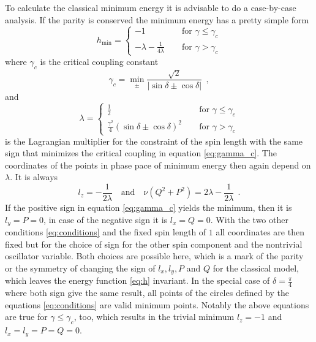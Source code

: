 To calculate the classical minimum energy it is advisable to do a case-by-case analysis. 
If the parity is conserved the minimum energy has a pretty simple form 
\begin{equation}
h_\text{min} =
\begin{cases}
-1 ~~~~ &\text{  for  }\gamma \leq \gamma_c \\
-\lambda - \frac{1}{4\lambda} ~~~~ &\text{  for  } \gamma > \gamma_c 
\end{cases}
\end{equation}
where $\gamma_c$ is the critical coupling constant
\begin{equation}
\gamma_c = \min\limits_{\pm} \frac{\sqrt{2}}{|\sin\delta \pm \cos \delta|}~~,
\label{eq:gamma_c}
\end{equation}
and
\begin{equation}
\lambda = \begin{cases}
\frac{1}{2} ~~~~ &\text{  for  } \gamma \leq \gamma_c \\
\frac{\gamma^2}{4}\left( \sin \delta \pm \cos\delta \right)^2 ~~~~ &\text{  for  } \gamma > \gamma_c 
\end{cases}\label{eq:lambdaCP}
\end{equation} is the Lagrangian multiplier for the constraint of the spin length with the same sign that minimizes the critical coupling in equation \eqref{eq:gamma_c}.
The coordinates of the points in phase pace of minimum energy then again depend on $\lambda$.
It is always 
\begin{equation}
l_z = -\frac{1}{2\lambda}~~~\text{ and }~~~ \nu\left( Q^2 + P^2\right) = 2\lambda - \frac{1}{2\lambda}~~.\label{eq:conditions}
\end{equation}
If the positive sign in equation \eqref{eq:gamma_c} yields the minimum, then it is $l_y = P = 0$, in case of the negative sign it is $l_x = Q = 0$.
With the two other conditions \eqref{eq:conditions} and the fixed spin length of $1$ all coordinates are then fixed but for the choice of sign for the other spin component and the nontrivial oscillator variable.
Both choices are possible here, which is a mark of the parity or the symmetry of changing the sign of $l_x, l_y, P$ and $Q$ for the classical model, which leaves the energy function \eqref{eq:h} invariant.
In the special case of $\delta = \frac{\pi}{4}$ where both sign give the same result, all points of the circles defined by the equations \eqref{eq:conditions} are valid minimum points.
Notably the above equations are true for $\gamma\leq \gamma_c$, too, which results in the trivial minimum $l_z = -1$ and $l_x=l_y=P=Q=0$.


